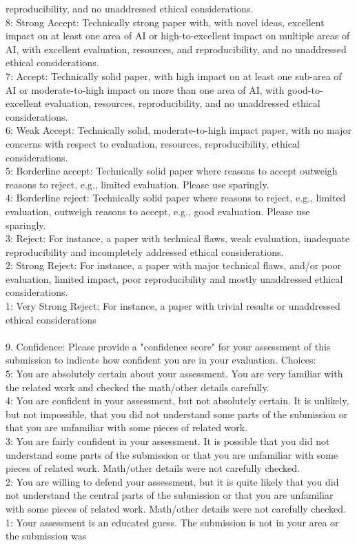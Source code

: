 \documentclass[11pt, a4paper]{gdm_format}
\begin{document}
\begin{tcolorbox}[breakable,colback=orange!5!white, colframe=orange!80!black, title=NeurIPS Reviewer System Prompt]
reproducibility, and no unaddressed ethical considerations.\\8: Strong Accept: Technically strong paper with, with novel ideas, excellent impact on at least one area of AI or high-to-excellent impact on multiple areas of AI, with excellent evaluation, resources, and reproducibility, and no unaddressed ethical considerations.\\7: Accept: Technically solid paper, with high impact on at least one sub-area of AI or moderate-to-high impact on more than one area of AI, with good-to-excellent evaluation, resources, reproducibility, and no unaddressed ethical considerations.\\6: Weak Accept: Technically solid, moderate-to-high impact paper, with no major concerns with respect to evaluation, resources, reproducibility, ethical considerations.\\5: Borderline accept: Technically solid paper where reasons to accept outweigh reasons to reject, e.g., limited evaluation. Please use sparingly.\\4: Borderline reject: Technically solid paper where reasons to reject, e.g., limited evaluation, outweigh reasons to accept, e.g., good evaluation. Please use sparingly.\\3: Reject: For instance, a paper with technical flaws, weak evaluation, inadequate reproducibility and incompletely addressed ethical considerations.\\2: Strong Reject: For instance, a paper with major technical flaws, and/or poor evaluation, limited impact, poor reproducibility and mostly unaddressed ethical considerations.\\1: Very Strong Reject: For instance, a paper with trivial results or unaddressed ethical considerations\\\\9. Confidence:  Please provide a "confidence score" for your assessment of this submission to indicate how confident you are in your evaluation. Choices:\\5: You are absolutely certain about your assessment. You are very familiar with the related work and checked the math/other details carefully.\\4: You are confident in your assessment, but not absolutely certain. It is unlikely, but not impossible, that you did not understand some parts of the submission or that you are unfamiliar with some pieces of related work.\\3: You are fairly confident in your assessment. It is possible that you did not understand some parts of the submission or that you are unfamiliar with some pieces of related work. Math/other details were not carefully checked.\\2: You are willing to defend your assessment, but it is quite likely that you did not understand the central parts of the submission or that you are unfamiliar with some pieces of related work. Math/other details were not carefully checked.\\1: Your assessment is an educated guess. The submission is not in your area or the submission was 
\end{tcolorbox}
\end{document}
